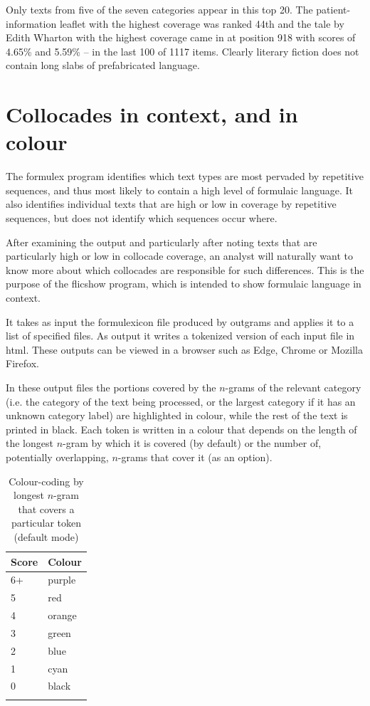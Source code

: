 \documentclass[output=paper]{langscibook}
\begin{document}
Only texts from five of the seven categories appear in this top 20. The patient-information leaflet with the highest coverage was ranked 44th and the tale by Edith Wharton with the highest coverage came in at position 918 with scores of 4.65\% and 5.59\% -- in the last 100 of 1117 items. Clearly literary fiction does not contain long slabs of prefabricated language.

\section{Collocades in context, and in colour}

The formulex program identifies which text types are most pervaded by repetitive sequences, and thus most likely to contain a high level of formulaic language. It also identifies individual texts that are high or low in coverage by repetitive sequences, but does not identify which sequences occur where.

After examining the output and particularly after noting texts that are particularly high or low in collocade coverage, an analyst will naturally want to know more about which collocades are responsible for such differences. This is the purpose of the flicshow program, which is intended to show formulaic language in context.

It takes as input the formulexicon file produced by outgrams and applies it to a list of specified files. As output it writes a tokenized version of each input file in html. These outputs can be viewed in a browser such as Edge, Chrome or Mozilla Firefox.

In these output files the portions covered by the $n$-grams of the relevant category (i.e. the category of the text being processed, or the largest category if it has an unknown category label) are highlighted in colour, while the rest of the text is printed in black. Each token is written in a colour that depends on the length of the longest $n$-gram by which it is covered (by default) or the number of, potentially overlapping, $n$-grams that cover it (as an option).

\begin{table}
\caption{Colour-coding by longest $n$-gram that covers a particular token (default mode)\label{tab:forsyth:5}}
\begin{tabular}{ll}
\lsptoprule
Score & Colour\\\midrule
6+ & purple\\
5 & red\\
4 & orange\\
3 & green\\
2 & blue\\
1 & cyan\\
0 & black\\
\lspbottomrule
\end{tabular}
\end{table}
\end{document}
